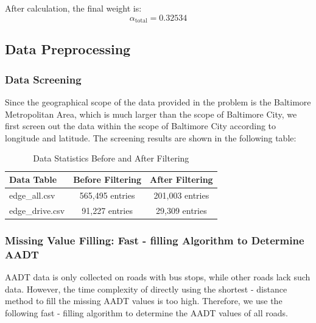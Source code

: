 \documentclass{mcmthesis}
\begin{document}
After calculation, the final weight is:
\begin{equation}
  \alpha_{\text{total}}=0.32534
\end{equation}

\subsection{Data Preprocessing}

\subsubsection{Data Screening}

Since the geographical scope of the data provided in the problem is the Baltimore Metropolitan Area, which is much larger than the scope of Baltimore City, we first screen out the data within the scope of Baltimore City according to longitude and latitude. The screening results are shown in the following table:

\begin{table}[H]
  \centering
  \caption{Data Statistics Before and After Filtering}
  \label{tab:data_filtering_stats}
  \begin{tabular}{@{}lcc@{}}
      \toprule
      \textbf{Data Table} & \textbf{Before Filtering} & \textbf{After Filtering} \\
      \midrule
      edge\_all.csv & 565,495 entries & 201,003 entries \\
      edge\_drive.csv & 91,227 entries & 29,309 entries \\
      \bottomrule
  \end{tabular}
\end{table}

\subsubsection{Missing Value Filling: Fast - filling Algorithm to Determine AADT}

AADT data is only collected on roads with bus stops, while other roads lack such data. However, the time complexity of directly using the shortest - distance method to fill the missing AADT values is too high. Therefore, we use the following fast - filling algorithm to determine the AADT values of all roads.
\end{document}
